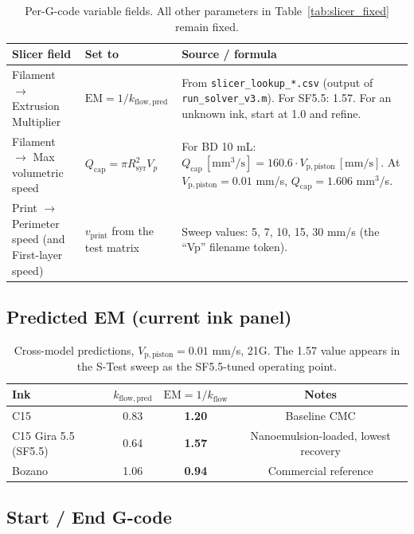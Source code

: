 \documentclass[11pt,a4paper]{article}
\begin{document}
\begin{table}[h]
\centering
\small
\begin{tabular}{p{4.2cm} p{3.8cm} p{6.4cm}}
\toprule
Slicer field & Set to & Source / formula \\
\midrule
Filament $\to$ Extrusion Multiplier &
  $\mathrm{EM} = 1/k_\mathrm{flow,pred}$ &
  From \texttt{slicer\_lookup\_*.csv} (output of
  \texttt{run\_solver\_v3.m}). For SF5.5: 1.57. For an unknown ink,
  start at 1.0 and refine. \\
Filament $\to$ Max volumetric speed &
  $Q_\mathrm{cap} = \pi R_\mathrm{syr}^2 V_p$ &
  For BD 10 mL: $Q_\mathrm{cap}\,[\mathrm{mm^3/s}] = 160.6 \cdot
  V_\mathrm{p,piston}\,[\mathrm{mm/s}]$. At $V_\mathrm{p,piston}
  = 0.01$ mm/s, $Q_\mathrm{cap} = 1.606$ mm$^3$/s. \\
Print $\to$ Perimeter speed (and First-layer speed) &
  $v_\mathrm{print}$ from the test matrix &
  Sweep values: 5, 7, 10, 15, 30 mm/s (the ``Vp'' filename token). \\
\bottomrule
\end{tabular}
\caption{Per-G-code variable fields. All other parameters in
Table~\ref{tab:slicer_fixed} remain fixed.}
\label{tab:slicer_variable}
\end{table}

\subsection{Predicted EM (current ink panel)}

\begin{table}[h]
\centering
\small
\begin{tabular}{lccc}
\toprule
Ink & $k_\mathrm{flow,pred}$ & $\mathrm{EM} = 1/k_\mathrm{flow}$ & Notes \\
\midrule
C15 & 0.83 & \textbf{1.20} & Baseline CMC \\
C15 Gira 5.5 (SF5.5) & 0.64 & \textbf{1.57} &
  Nanoemulsion-loaded, lowest recovery \\
Bozano & 1.06 & \textbf{0.94} & Commercial reference \\
\bottomrule
\end{tabular}
\caption{Cross-model predictions, $V_\mathrm{p,piston}=0.01$ mm/s,
21G. The 1.57 value appears in the S-Test sweep as the
SF5.5-tuned operating point.}
\end{table}

\subsection{Start / End G-code}
\end{document}
